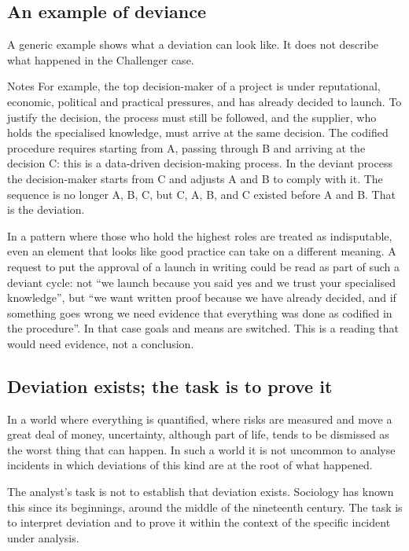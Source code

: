 \subsection{An example of deviance}
A generic example shows what a deviation can look like. It does not describe what happened in the Challenger case.

\begin{nota}{Notes}
	For example, the top decision-maker of a project is under reputational, economic, political and practical pressures, and has already decided to launch. To justify the decision, the process must still be followed, and the supplier, who holds the specialised knowledge, must arrive at the same decision. The codified procedure requires starting from A, passing through B and arriving at the decision C: this is a data-driven decision-making process. In the deviant process the decision-maker starts from C and adjusts A and B to comply with it. The sequence is no longer A, B, C, but C, A, B, and C existed before A and B. That is the deviation.
\end{nota}

In a pattern where those who hold the highest roles are treated as indisputable, even an element that looks like good practice can take on a different meaning. A request to put the approval of a launch in writing could be read as part of such a deviant cycle: not ``we launch because you said yes and we trust your specialised knowledge'', but ``we want written proof because we have already decided, and if something goes wrong we need evidence that everything was done as codified in the procedure''. In that case goals and means are switched. This is a reading that would need evidence, not a conclusion.

\subsection{Deviation exists; the task is to prove it}
In a world where everything is quantified, where risks are measured and move a great deal of money, uncertainty, although part of life, tends to be dismissed as the worst thing that can happen. In such a world it is not uncommon to analyse incidents in which deviations of this kind are at the root of what happened.

The analyst's task is not to establish that deviation exists. Sociology has known this since its beginnings, around the middle of the nineteenth century. The task is to interpret deviation and to prove it within the context of the specific incident under analysis.

